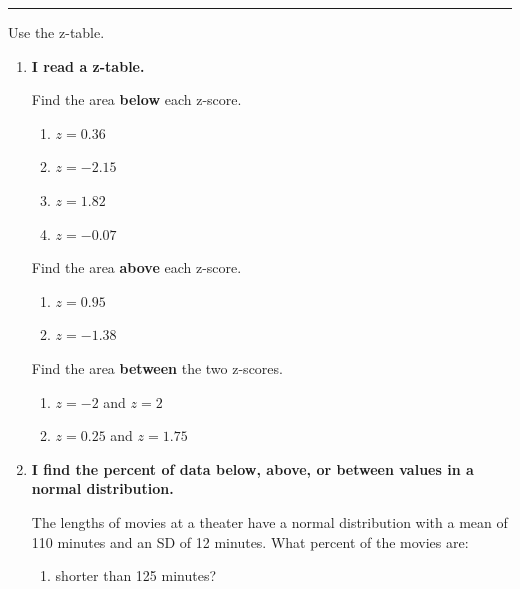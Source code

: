 \documentclass[11pt]{article}
\newcommand{\lessonhead}[1]{\par\vspace{0.6em}{\large\bfseries #1}\par\vspace{0.25em}\hrule\vspace{0.6em}}
\newcommand{\goal}[1]{\textbf{#1}\par\vspace{0.35em}}
\begin{document}
\newpage
\lessonhead{2.5 - Normal Calculations with a Z-Table}
Use the z-table.
\begin{enumerate}[resume]

\item \goal{I read a z-table.}
\begin{minipage}[t]{0.48\linewidth}\vspace{0pt}\raggedright
Find the area \textbf{below} each z-score.
\begin{enumerate}[itemsep=1em]
  \item $z = 0.36$ 
  \item $z = -2.15$ 
  \item $z = 1.82$ 
  \item $z = -0.07$ 
\end{enumerate}
\end{minipage}\hfill
\begin{minipage}[t]{0.48\linewidth}\vspace{0pt}\raggedright
Find the area \textbf{above} each z-score.
\begin{enumerate}[start=5,itemsep=1em]
  \item $z = 0.95$ 
  \item $z = -1.38$ 
\end{enumerate}

\vspace{1.2em}
Find the area \textbf{between} the two z-scores.
\begin{enumerate}[start=7,itemsep=1em]
  \item $z = -2$ and $z = 2$ 
  \item $z = 0.25$ and $z = 1.75$ 
\end{enumerate}
\end{minipage}

\vspace{0.6em}
\item \goal{I find the percent of data below, above, or between values in a normal distribution.}
The lengths of movies at a theater have a normal distribution with a mean of 110 minutes and an SD of 12 minutes. What percent of the movies are:
\begin{enumerate}[itemsep=0.8em]
  \item shorter than 125 minutes?


\end{enumerate}
\end{enumerate}
\end{document}
